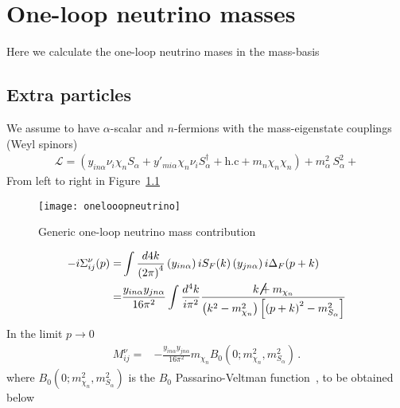 \chapter{One-loop neutrino masses}
Here we calculate the one-loop neutrino mases in the mass-basis

\section{Extra particles}
We assume to have $\alpha$-scalar and $n$-fermions with the mass-eigenstate couplings (Weyl spinors)
\begin{align}
  \mathcal{L}=\left(y_{in\alpha}\nu_{i}\chi_n S_{\alpha}+y'_{mi\alpha}\chi_n\nu_{i} S_{\alpha}^{\dagger}+\text{h.c}+m_n \chi_n\chi_n  \right)+m_{\alpha}^2\,S_{\alpha}^2+
\end{align}
From left to right in Figure~\ref{fig:1lnu}
\begin{figure}
  \centering
  \texttt{[image: onelooopneutrino]}
  \caption{Generic one-loop neutrino mass contribution}
  \label{fig:1lnu}
\end{figure}
\begin{align}
-i\Sigma^{\nu}_{ij}(p)=&\int \frac{d4k}{\left( 2\pi \right)^{4}}\left(y_{in\alpha}  \right)iS_F(k) \left(y_{jn\alpha}\right)i\Delta_F(p+k) \nonumber\\
=&\frac{y_{i n\alpha}y_{j n\alpha}}{16\pi^2}\int \frac{d^4k}{i\pi^2}\frac{\cancel{k}+m_{\chi_n}}{\left(k^2-m_{\chi_n}^2  \right)\left[\left(p+k\right)^2-m_{S_\alpha}^2\right]}
\end{align}
In the limit $p\to 0$
\begin{align}
\label{eq:mnub0}
   M^{\nu}_{ij}=&-\frac{y_{i n\alpha}y_{j n\alpha}}{16\pi^2}m_{\chi_n} B_0 \left( 0;m_{\chi_n}^2,m_{S_{\alpha}}^2 \right) \,.
\end{align}
where $B_0\left
(0;m_{\chi_n}^2,m^2_{S_{\alpha}} \right)$ is the $B_0$ Passarino-Veltman function~\cite{Passarino:1978jh}, to be obtained below

